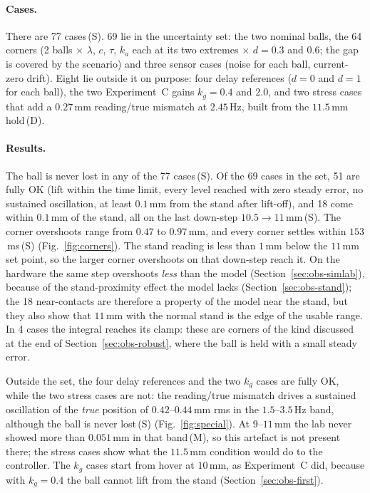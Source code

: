 \documentclass[11pt,a4paper]{article}
\newcommand{\st}[1]{\,\textup{(#1)}}
\begin{document}
\paragraph{Cases.} There are 77 cases\st{S}. 69 lie in the uncertainty set: the two nominal balls, the 64 corners (2 balls
$\times$ $\lambda$, $c$, $\tau$, $k_a$ each at its two extremes $\times$ $d = 0.3$ and $0.6$; the gap is covered by the
scenario) and three sensor cases (noise for each ball, current-zero drift). Eight lie outside it on purpose: four delay
references ($d = 0$ and $d = 1$ for each ball), the two Experiment~C gains $k_g = 0.4$ and $2.0$, and two stress cases that
add a $0.27$\,mm reading/true mismatch at $2.45$\,Hz, built from the $11.5$\,mm hold\st{D}.

\paragraph{Results.} The ball is never lost in any of the 77 cases\st{S}. Of the 69 cases in the set, 51 are fully OK
(lift within the time limit, every level reached with zero steady error, no sustained oscillation, at least $0.1$\,mm from
the stand after lift-off), and 18 come within $0.1$\,mm of the stand, all on the last down-step $10.5 \to 11$\,mm\st{S}.  The corner overshoots range from $0.47$ to
$0.97$\,mm, and every corner settles within $153$\,ms\st{S} (Fig.~\ref{fig:corners}). The stand reading is less than
$1$\,mm below the $11$\,mm set point, so the larger corner overshoots on that down-step reach it. On the hardware
the same step overshoots \emph{less} than the model (Section~\ref{sec:obs-simlab}), because of the stand-proximity effect
the model lacks (Section~\ref{sec:obs-stand}); the 18 near-contacts are therefore a property of the model near the stand, but
they also show that $11$\,mm with the normal stand is the edge of the usable range. In 4 cases the integral reaches its
clamp: these are corners of the kind discussed at the end of Section~\ref{sec:obs-robust}, where the ball is held with a small
steady error.

Outside the set, the four delay references and the two $k_g$ cases are fully OK, while the two stress cases are not: the
reading/true mismatch drives a sustained oscillation of the \emph{true} position of $0.42$--$0.44$\,mm rms in the
$1.5$--$3.5$\,Hz band, although the ball is never lost\st{S} (Fig.~\ref{fig:special}). At $9$--$11$\,mm the lab never showed more
than $0.051$\,mm in that band\st{M}, so this artefact is not present there; the stress cases show what the $11.5$\,mm
condition would do to the controller. The $k_g$ cases start from hover at $10$\,mm, as Experiment~C did, because with $k_g = 0.4$ the ball cannot lift
from the stand (Section~\ref{sec:obs-first}).
\end{document}
